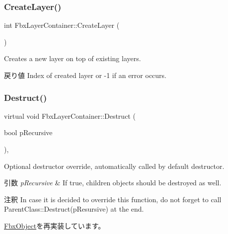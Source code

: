 \mbox{\label{class_fbx_layer_container_a6c94199b503304c310274f6d88919cea}} 
\subsubsection{\texorpdfstring{Create\+Layer()}{CreateLayer()}}
{\footnotesize\ttfamily int Fbx\+Layer\+Container\+::\+Create\+Layer (\begin{DoxyParamCaption}{ }\end{DoxyParamCaption})}

Creates a new layer on top of existing layers. \begin{DoxyReturn}{戻り値}
Index of created layer or -\/1 if an error occurs. 
\end{DoxyReturn}
\mbox{\label{class_fbx_layer_container_aefb90aadf569c7ebbbd3672e9c45776f}} 
\subsubsection{\texorpdfstring{Destruct()}{Destruct()}}
{\footnotesize\ttfamily virtual void Fbx\+Layer\+Container\+::\+Destruct (\begin{DoxyParamCaption}\item[{bool}]{p\+Recursive }\end{DoxyParamCaption})\hspace{0.3cm}{\ttfamily [protected]}, {\ttfamily [virtual]}}

Optional destructor override, automatically called by default destructor. 
\begin{DoxyParams}{引数}
{\em p\+Recursive} & If true, children objects should be destroyed as well. \\
\hline
\end{DoxyParams}
\begin{DoxyRemark}{注釈}
In case it is decided to override this function, do not forget to call Parent\+Class\+::\+Destruct(p\+Resursive) at the end. 
\end{DoxyRemark}


\hyperlink{class_fbx_object_a123e084d9b32b29c28af6384b7c3c608}{Fbx\+Object}を再実装しています。



